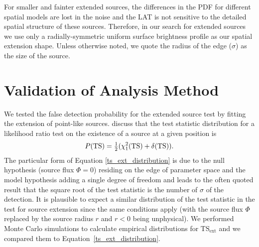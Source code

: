 \documentclass[12pt,preprint]{aastex}
\newcommand{\tsext}{{\ensuremath{\text{TS}_{\text{ext}}}}\xspace}
\newcommand{\ts}{\text{TS}\xspace}
\begin{document}
For smaller and fainter extended sources, the differences in the PDF for
different spatial models are lost in the noise and the LAT is not sensitive
to the detailed spatial structure of these sources.  Therefore, in our
search for extended sources we use only a radially-symmetric uniform
surface brightness profile as our spatial extension shape. Unless otherwise noted,
we quote the radius of the edge ($\sigma$) as the size of the source.

\section{Validation of Analysis Method}

\label{monte_carlo_validation}

We tested the false detection probability for the extended source test
by fitting the extension of point-like sources.  \cite{mattox_egret}
discuss that the test statistic distribution for a likelihood ratio test
on the existence of a source at a given position is
\begin{equation}\label{ts_ext_distribution}
  P(\ts)=\onehalf(\chi^2_1(\ts)+\delta(\ts)).
\end{equation}
The particular form of Equation \ref{ts_ext_distribution} is due to the
null hypothesis (source flux $\Phi=0$) residing on the edge of parameter
space and the model hypothesis adding a single degree of freedom and
leads to the often quoted result that the square root of the test
statistic is the number of $\sigma$ of the detection. It is plausible
to expect a similar distribution of the test statistic in the test for
source extension since the same conditions apply (with the source flux
$\Phi$ replaced by the source radius $r$ and $r<0$ being unphysical).
We performed Monte Carlo simulations to calculate empirical distributions
for $\tsext$ and we compared them to Equation~\ref{ts_ext_distribution}.
\end{document}
